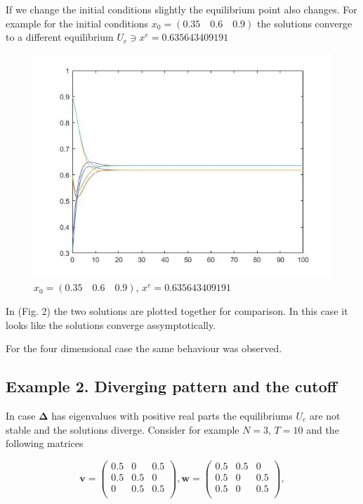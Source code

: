 \documentclass[a4paper,10pt, english]{article}
\begin{document}
\newpage
If we change the initial conditions slightly the equilibrium point also changes. For example for the initial conditions
$x_0 = (0.35\quad 0.6\quad 0.9)$ the solutions converge to a different  equilibrium $U_e\ni x^e = 0.635643409191$
\begin{figure}[ht]
\label{fig_c2}
\centering
\includegraphics[scale= 0.4]{2.jpg}

\caption{$x_0 = (0.35 \quad0.6\quad 0.9)$, $x^e = 0.635643409191$}
\end{figure}
In (Fig. 2) the two solutions are plotted together for comparison.
In this case it looks like the solutions converge assymptotically.

For the four dimensional case the same behaviour was observed. 



\newpage


\subsection{Example 2. Diverging pattern and the cutoff}
In case  $\mathbf{\Delta}$ has eigenvalues with positive real parts the equilibriums  $U_e$ are not stable and the solutions diverge. Consider for example $N=3$, $T=10$ and the following matrices

\[\mathbf{v} =  \left( \begin{array}{ccc}
 0.5& 0& 0.5\\ 
 0.5 &0.5 &0\\
 0& 0.5& 0.5\\
\end{array} \right),
%
\mathbf{w} = 
\left( \begin{array}{ccc}
0.5& 0.5& 0\\ 
0.5 &0 &0.5\\ 
0.5& 0& 0.5\\
\end{array} \right),
\]
\end{document}
